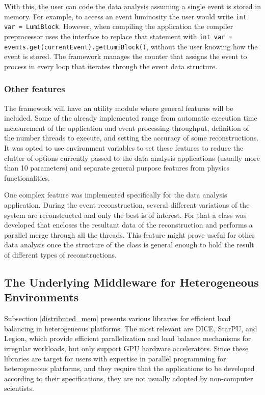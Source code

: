 With this, the user can code the data analysis assuming a single event is stored in memory. For example, to access an event luminosity the user would write \texttt{int var = LumiBlock}. However, when compiling the application the compiler preprocessor uses the interface to replace that statement with \texttt{int var = events.get(currentEvent).getLumiBlock()}, without the user knowing how the event is stored. The framework manages the counter that assigns the event to process in every loop that iterates through the event data structure.

\subsubsection*{Other features}

The framework will have an utility module where general features will be included. Some of the already implemented range from automatic execution time measurement of the application and event processing throughput, definition of the number threads to execute, and setting the accuracy of some reconstructions. It was opted to use environment variables to set these features to reduce the clutter of options currently passed to the data analysis applications (usually more than 10 parameters) and separate general purpose features from physics functionalities.

One complex feature was implemented specifically for the \ttH data analysis application. During the event reconstruction, several different variations of the system are reconstructed and only the best is of interest. For that a class was developed that encloses the resultant data of the reconstruction and performs a parallel merge through all the threads. This feature might prove useful for other data analysis once the structure of the class is general enough to hold the result of different types of reconstructions.

\subsection{The Underlying Middleware for Heterogeneous Environments}
\label{middleware}

Subsection \ref{distributed_mem} presents various libraries for efficient load balancing in heterogeneous platforms. The most relevant are DICE, StarPU, and Legion, which provide efficient parallelization and load balance mechanisms for irregular workloads, but only support GPU hardware accelerators. Since these libraries are target for users with expertise in parallel programming for heterogeneous platforms, and they require that the applications to be developed according to their specifications, they are not usually adopted by non-computer scientists.

